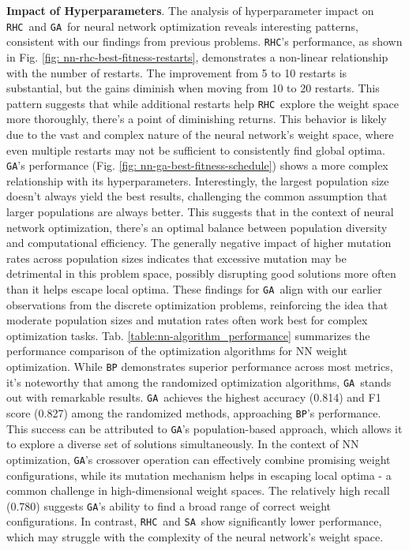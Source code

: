\documentclass[conference]{IEEEtran}
\newcommand{\sa}{\texttt{SA}}
\newcommand{\ga}{\texttt{GA}}
\newcommand{\rhc}{\texttt{RHC}}
\begin{document}
\textbf{Impact of Hyperparameters}.
The analysis of hyperparameter impact on \rhc\ and \ga\ for neural network optimization reveals interesting patterns, consistent with our findings from previous problems.
\rhc's performance, as shown in Fig. \ref{fig: nn-rhc-best-fitness-restarts}, demonstrates a non-linear relationship with the number of restarts. The improvement from 5 to 10 restarts is substantial, but the gains diminish when moving from 10 to 20 restarts. This pattern suggests that while additional restarts help \rhc\ explore the weight space more thoroughly, there's a point of diminishing returns. This behavior is likely due to the vast and complex nature of the neural network's weight space, where even multiple restarts may not be sufficient to consistently find global optima.
\ga's performance (Fig. \ref{fig: nn-ga-best-fitness-schedule}) shows a more complex relationship with its hyperparameters. Interestingly, the largest population size doesn't always yield the best results, challenging the common assumption that larger populations are always better. This suggests that in the context of neural network optimization, there's an optimal balance between population diversity and computational efficiency. The generally negative impact of higher mutation rates across population sizes indicates that excessive mutation may be detrimental in this problem space, possibly disrupting good solutions more often than it helps escape local optima.
These findings for \ga\ align with our earlier observations from the discrete optimization problems, reinforcing the idea that moderate population sizes and mutation rates often work best for complex optimization tasks.
Tab. \ref{table:nn-algorithm_performance} summarizes the performance comparison of the optimization algorithms for NN weight optimization. While \verb|BP| demonstrates superior performance across most metrics, it's noteworthy that among the randomized optimization algorithms, \ga\ stands out with remarkable results. \ga\ achieves the highest accuracy (0.814) and F1 score (0.827) among the randomized methods, approaching \verb|BP|'s performance. This success can be attributed to \ga's population-based approach, which allows it to explore a diverse set of solutions simultaneously. In the context of NN optimization, \ga's crossover operation can effectively combine promising weight configurations, while its mutation mechanism helps in escaping local optima - a common challenge in high-dimensional weight spaces. The relatively high recall (0.780) suggests \ga's ability to find a broad range of correct weight configurations. In contrast, \rhc\ and \sa\ show significantly lower performance, which may struggle with the complexity of the neural network's weight space. 
\end{document}
